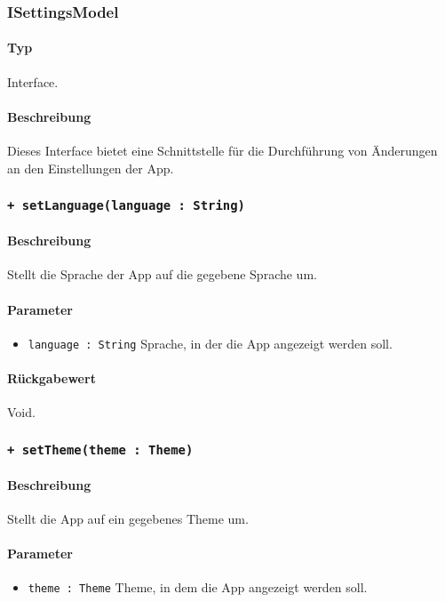 \subsubsection{ISettingsModel}
\paragraph*{Typ}
Interface.
\paragraph*{Beschreibung}
Dieses Interface bietet eine Schnittstelle für die Durchführung von Änderungen an den Einstellungen der App.

\subsubsection*{\texttt{+ setLanguage(language : String)}}%
\paragraph*{Beschreibung}
Stellt die Sprache der App auf die gegebene Sprache um.
\paragraph*{Parameter}
\begin{itemize}
    \item \texttt{language : String} Sprache, in der die App angezeigt werden soll.
\end{itemize}
\paragraph*{Rückgabewert}
Void.

\subsubsection*{\texttt{+ setTheme(theme : Theme)}}%
\paragraph*{Beschreibung}
Stellt die App auf ein gegebenes Theme um.
\paragraph*{Parameter}
\begin{itemize}
    \item \texttt{theme : Theme} Theme, in dem die App angezeigt werden soll.
\end{itemize}

